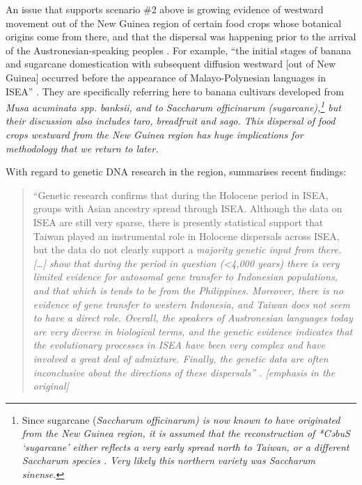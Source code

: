 An issue that supports scenario {\#}2 above is growing evidence of westward movement out of the New Guinea
region of certain food crops whose botanical origins come from there,
and that the dispersal was happening prior to the arrival of the Austronesian-speaking peoples
\citep{DenhamDonohue2009,DonohueDenham2010,Schapper2017}.
For example, “the initial stages of banana
and sugarcane domestication with subsequent diffusion westward [out of New Guinea] occurred before the
appearance of Malayo-Polynesian languages in ISEA” \citep[20]{DonohueDenham2010}.
They are specifically referring here to banana cultivars developed from \it{Musa acuminata} spp.
\it{banksii}, and to \it{Saccharum officinarum} (sugarcane),\footnote{
		Since sugarcane (\it{Saccharum
		officinarum}) is now known to have originated from the New Guinea region,
		it is assumed that the  reconstruction of *CəbuS ‘sugarcane’ either reflects a very early spread north
		to Taiwan, or a different \it{Saccharum} species \citep[515]{Spriggs2011}.
		Very likely this northern variety was \it{Saccharum sinense}.}
but their discussion also includes taro, breadfruit and sago.
This dispersal of food crops westward from the New Guinea region has huge implications for methodology
that we return to later.

With regard to genetic DNA research in the region,
\citet[18]{Klamer2019} summarises recent findings:

\begin{quote}
	``Genetic research confirms that during the Holocene period in ISEA,
	groups with Asian ancestry spread through ISEA.
	Although the data on ISEA are still very sparse,
	there is presently statistical support that Taiwan played
	an instrumental role in Holocene dispersals
	across ISEA, but the data do not clearly support a \it{majority}
	genetic input from there.
	[{\ldots}] \citet{HudjashovCox2017} show
	that during the period in question (<4,000 years)
	there is very limited evidence for autosomal
	gene transfer to Indonesian populations,
	and that which is tends to be from the Philippines.
	Moreover, there is no evidence of gene transfer to western Indonesia,
	and Taiwan does not seem to have a direct role.
	Overall, the speakers of Austronesian languages today
	are very diverse in biological terms,
	and the genetic evidence indicates that the evolutionary processes
	in ISEA have been very complex
	and have involved a great deal of admixture.
	Finally, the genetic data are often inconclusive about the directions
	of these dispersals'' \citep[265]{LansingSudoyo2011}.
	[emphasis in the original]
\end{quote}

